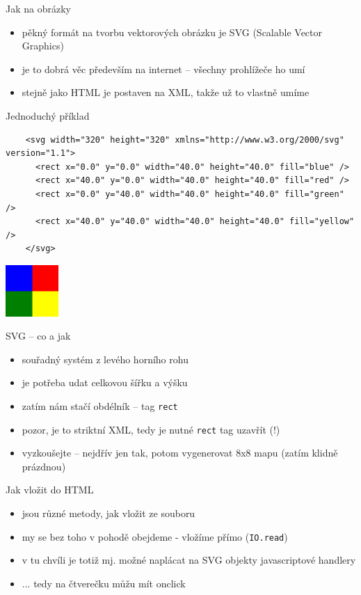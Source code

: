 \documentclass{beamer}
\begin{document}
\begin{frame}{Jak na obrázky}
  \begin{itemize}
    \item pěkný formát na tvorbu vektorových obrázku je SVG (Scalable Vector Graphics)
    \item je to dobrá věc především na internet -- všechny prohlížeče ho umí
    \item stejně jako HTML je postaven na XML, takže už to vlastně umíme
  \end{itemize}
\end{frame}

\begin{frame}[fragile]{Jednoduchý příklad}
  \tiny
  \begin{verbatim}
    <svg width="320" height="320" xmlns="http://www.w3.org/2000/svg" version="1.1">
      <rect x="0.0" y="0.0" width="40.0" height="40.0" fill="blue" />
      <rect x="40.0" y="0.0" width="40.0" height="40.0" fill="red" />
      <rect x="0.0" y="40.0" width="40.0" height="40.0" fill="green" />
      <rect x="40.0" y="40.0" width="40.0" height="40.0" fill="yellow" />
    </svg>
  \end{verbatim}
  \includegraphics[width=0.15\textwidth]{example}
\end{frame}

\begin{frame}{SVG -- co a jak}
  \begin{itemize}
    \item souřadný systém z levého horního rohu
    \item je potřeba udat celkovou šířku a výšku
    \item zatím nám stačí obdélník -- tag \texttt{rect}
    \item pozor, je to striktní XML, tedy je nutné \texttt{rect} tag uzavřít (!)
    \item vyzkoušejte -- nejdřív jen tak, potom vygenerovat 8x8 mapu (zatím klidně prázdnou)
  \end{itemize}
\end{frame}

\begin{frame}{Jak vložit do HTML}
  \begin{itemize}
    \item jsou různé metody, jak vložit ze souboru
    \item my se bez toho v pohodě obejdeme - vložíme přímo (\texttt{IO.read})
    \item v tu chvíli je totiž mj. možné naplácat na SVG objekty javascriptové handlery
    \item ... tedy na čtverečku můžu mít onclick
  \end{itemize}
\end{frame}
\end{document}
